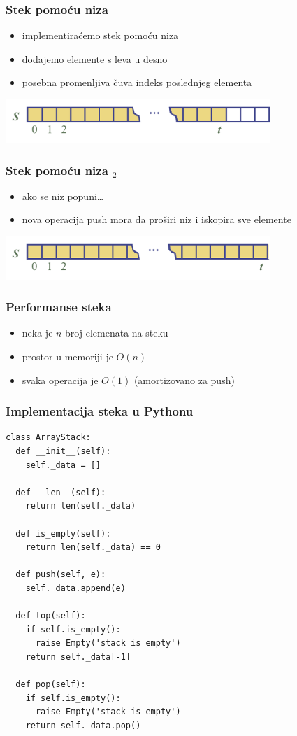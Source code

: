 \documentclass[compress,aspectratio=169]{beamer}
\begin{document}
\begin{frame}[fragile]
  \frametitle{Stek pomoću niza}
  \begin{itemize}
    \item implementiraćemo stek pomoću niza
    \item dodajemo elemente s leva u desno
    \item posebna promenljiva čuva indeks poslednjeg elementa
  \end{itemize}
  \begin{center}
    \includegraphics[width=10cm]{asp-05-pic02.png}
  \end{center}
\end{frame}

\begin{frame}[fragile]
  \frametitle{Stek pomoću niza $_2$}
  \begin{itemize}
    \item ako se niz popuni\ldots
    \item nova operacija push mora da proširi niz i iskopira sve elemente
  \end{itemize}
  \begin{center}
    \includegraphics[width=10cm]{asp-05-pic03.png}
  \end{center}
\end{frame}

\begin{frame}[fragile]
  \frametitle{Performanse steka}
  \begin{itemize}
    \item neka je $n$ broj elemenata na steku
    \item prostor u memoriji je $O(n)$
    \item svaka operacija je $O(1)$ (amortizovano za push)
  \end{itemize}
\end{frame}

\begin{frame}[fragile,shrink=10]
  \frametitle{Implementacija steka u Pythonu}
\begin{verbatim}
class ArrayStack:
  def __init__(self):
    self._data = []
  
  def __len__(self):
    return len(self._data)
    
  def is_empty(self):
    return len(self._data) == 0
  
  def push(self, e):
    self._data.append(e)
    
  def top(self):
    if self.is_empty():
      raise Empty('stack is empty')
    return self._data[-1]
    
  def pop(self):
    if self.is_empty():
      raise Empty('stack is empty')
    return self._data.pop()
\end{verbatim}
\end{frame}
\end{document}
